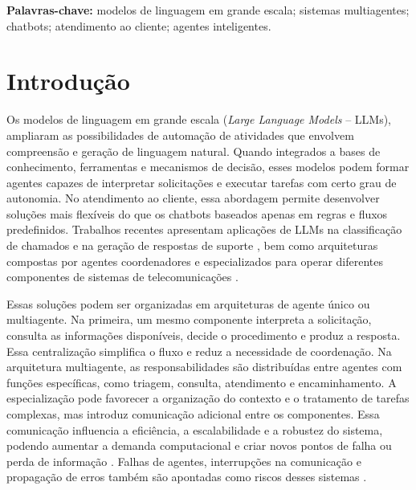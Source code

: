 \documentclass[11pt]{ifscarticle}
\begin{document}
\noindent\textbf{Palavras-chave:} modelos de linguagem em grande escala; sistemas multiagentes; chatbots; atendimento ao cliente; agentes inteligentes.

\section{Introdução}

Os modelos de linguagem em grande escala (\textit{Large Language Models} -- LLMs), ampliaram as possibilidades de automação de atividades que envolvem compreensão e geração de linguagem natural. Quando integrados a bases de conhecimento, ferramentas e mecanismos de decisão, esses modelos podem formar agentes capazes de interpretar solicitações e executar tarefas com certo grau de autonomia. No atendimento ao cliente, essa abordagem permite desenvolver soluções mais flexíveis do que os chatbots baseados apenas em regras e fluxos predefinidos. Trabalhos recentes apresentam aplicações de LLMs na classificação de chamados e na geração de respostas de suporte \cite{c.moncadaLargeLanguageModels2025a}, bem como arquiteturas compostas por agentes coordenadores e especializados para operar diferentes componentes de sistemas de telecomunicações \cite{k.-y.leeEnhancingTelecomOperation2025a}.

Essas soluções podem ser organizadas em arquiteturas de agente único ou multiagente. Na primeira, um mesmo componente interpreta a solicitação, consulta as informações disponíveis, decide o procedimento e produz a resposta. Essa centralização simplifica o fluxo e reduz a necessidade de coordenação. Na arquitetura multiagente, as responsabilidades são distribuídas entre agentes com funções específicas, como triagem, consulta, atendimento e encaminhamento. A especialização pode favorecer a organização do contexto e o tratamento de tarefas complexas, mas introduz comunicação adicional entre os componentes. Essa comunicação influencia a eficiência, a escalabilidade e a robustez do sistema, podendo aumentar a demanda computacional e criar novos pontos de falha ou perda de informação \cite{yanSelfTalkCommunicationCentricSurvey2026}. Falhas de agentes, interrupções na comunicação e propagação de erros também são apontadas como riscos desses sistemas \cite{j.owotogbeAssessingEnhancingRobustness2025a}.
\end{document}
